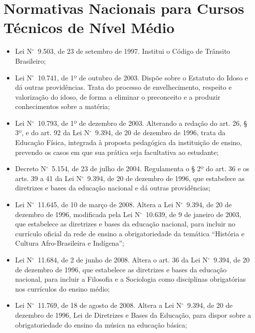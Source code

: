 \documentclass[
	12pt,				%
	openright,			%
	twoside,			%
	a4paper,			%
	chapter=TITLE,		%
	english,			%
	french,				%
	spanish,			%
	brazil,				%
	]{abntex2}
\newcommand{\n}{N$^\circ$}
\begin{document}
\section{Normativas Nacionais para Cursos Técnicos de Nível Médio}

\begin{itemize}
    
   \item Lei \n~9.503, de 23 de setembro de 1997. Institui o Código de Trânsito Brasileiro;

   \item Lei \n~10.741, de 1º de outubro de 2003. Dispõe sobre o Estatuto do Idoso e dá outras
providências. Trata do processo de envelhecimento, respeito e valorização do idoso, de
forma a eliminar o preconceito e a produzir conhecimentos sobre a matéria;

   \item Lei \n~10.793, de 1º de dezembro de 2003. Alterando a redação do art. 26, § 3º, e do art. 92
da Lei \n~9.394, de 20 de dezembro de 1996, trata da Educação Física, integrada à proposta
pedagógica da instituição de ensino, prevendo os casos em que sua prática seja facultativa
ao estudante;

   \item Decreto \n~5.154, de 23 de julho de 2004. Regulamenta o § 2º do art. 36 e os arts. 39 a 41 da
Lei \n~9.394, de 20 de dezembro de 1996, que estabelece as diretrizes e bases da educação
nacional e dá outras providências;

   \item Lei \n~11.645, de 10 de março de 2008. Altera a Lei \n~9.394, de 20 de dezembro de 1996,
modificada pela Lei \n~10.639, de 9 de janeiro de 2003, que estabelece as diretrizes e bases
da educação nacional, para incluir no currículo oficial da rede de ensino a obrigatoriedade
da temática  ``História e Cultura Afro-Brasileira e Indígena'';

   \item Lei \n~11.684, de 2 de junho de 2008. Altera o art. 36 da Lei \n~9.394, de 20 de dezembro de
1996, que estabelece as diretrizes e bases da educação nacional, para incluir a Filosofia e a
Sociologia como disciplinas obrigatórias nos currículos do ensino médio;

   \item Lei \n~11.769, de 18 de agosto de 2008. Altera a Lei \n~9.394, de 20 de dezembro de 1996,
Lei de Diretrizes e Bases da Educação, para dispor sobre a obrigatoriedade do ensino da
música na educação básica;


\end{itemize}
\end{document}
